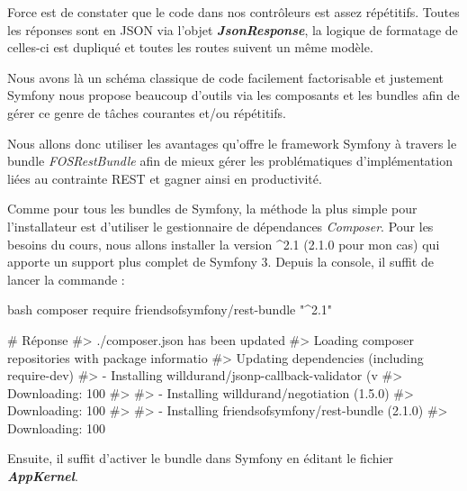 \documentclass[big]{zmdocument}
\begin{document}
Force est de constater que le code dans nos contrôleurs est assez répétitifs. Toutes les réponses sont en JSON via l'objet \textbf{\textit{JsonResponse}}, la logique de formatage de celles-ci est dupliqué et toutes les routes suivent un même modèle.



Nous avons là un schéma classique de code facilement factorisable et justement Symfony nous propose beaucoup d'outils via les composants et les bundles afin de gérer ce genre de tâches courantes et/ou répétitifs.



Nous allons donc utiliser les avantages qu'offre le framework Symfony à travers le bundle \textit{FOSRestBundle} afin de mieux gérer les problématiques d'implémentation liées au contrainte REST et gagner ainsi en productivité.





Comme pour tous les bundles de Symfony, la méthode la plus simple pour l'installateur est d'utiliser le gestionnaire de dépendances \textit{Composer}. 
Pour les besoins du cours, nous allons installer la version \textasciicircum{}2.1 (2.1.0 pour mon cas) qui apporte un support plus complet de Symfony 3.
Depuis la console, il suffit de lancer la commande :



\begin{CodeBlock}{bash}
composer require friendsofsymfony/rest-bundle "^2.1"

# Réponse
#> ./composer.json has been updated
#> Loading composer repositories with package informatio
#> Updating dependencies (including require-dev)
#>   - Installing willdurand/jsonp-callback-validator (v
#>     Downloading: 100%
#> 
#>   - Installing willdurand/negotiation (1.5.0)
#>     Downloading: 100%
#> 
#>   - Installing friendsofsymfony/rest-bundle (2.1.0)
#>     Downloading: 100%
\end{CodeBlock}



Ensuite, il suffit d'activer le bundle dans Symfony en éditant le fichier \textbf{\textit{AppKernel}}.



\end{document}
